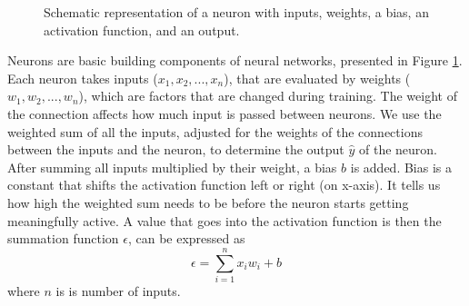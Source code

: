 \begin{figure}[htp]
	\centering
	
	\caption{Schematic representation of a neuron with inputs, weights, a bias, an activation function, and an output.}
	\label{fig:neuron}
\end{figure}


Neurons are basic building components of neural networks, presented in Figure \ref{fig:neuron}. Each neuron takes inputs ($x_1, x_2, ..., x_n$), that are evaluated by weights ($w_1, w_2, ..., w_n$), which are factors that are changed during training. The weight of the connection affects how much input is passed between neurons. We use the weighted sum of all the inputs, adjusted for the weights of the connections between the inputs and the neuron, to determine the output $\hat{y}$ of the neuron. After summing all inputs multiplied by their weight, a bias $b$ is added. Bias is a constant that shifts the activation function left or right (on x-axis). It tells us how high the weighted sum needs to be before the neuron starts getting meaningfully active. A value that goes into the activation function is then the summation function $\epsilon$, can be expressed as
\begin{equation}
	\epsilon = \sum_{i=1}^{n} x_i w_i + b
	\label{eq:weighted_sum}
\end{equation}
where $n$ is is number of inputs.


